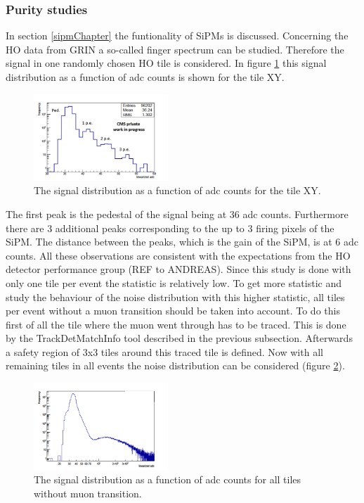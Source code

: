 		\subsubsection{Purity studies}
			In section \ref{sipmChapter} the funtionality of SiPMs is discussed.
			Concerning the HO data from GRIN a so-called finger spectrum can be studied.
			Therefore the signal in one randomly chosen HO tile is considered.
			In figure \ref{fig:noise_low} this signal distribution as a function of adc counts is shown for the tile XY.
			\begin{figure}[htbp]
				\centering
				\includegraphics[width=0.45\textwidth]{Figures/erdogan/noise_low.png}
				\caption{The signal distribution as a function of adc counts for the tile XY.}
				\label{fig:noise_low}
			\end{figure}
			The first peak is the pedestal of the signal being at 36 adc counts.
			Furthermore there are 3 additional peaks corresponding to the up to 3 firing pixels of the SiPM.
			The distance between the peaks, which is the gain of the SiPM, is at 6 adc counts.
			All these observations are consistent with the expectations from the HO detector performance group (REF to ANDREAS).
			Since this study is done with only one tile per event the statistic is relatively low.
			To get more statistic and study the behaviour of the noise distribution with this higher statistic, all tiles per event without a muon transition should be taken into account.
			To do this first of all the tile where the muon went through has to be traced.
			This is done by the TrackDetMatchInfo tool described in the previous subsection.
			Afterwards a safety region of 3x3 tiles around this traced tile is defined.
			Now with all remaining tiles in all events the noise distribution can be considered (figure \ref{fig:noise_high}).
			\begin{figure}[htbp]
				\centering
				\includegraphics[width=0.45\textwidth]{Figures/erdogan/noise_high.png}
				\caption{The signal distribution as a function of adc counts for all tiles without muon transition.}
				\label{fig:noise_high}
			\end{figure}
